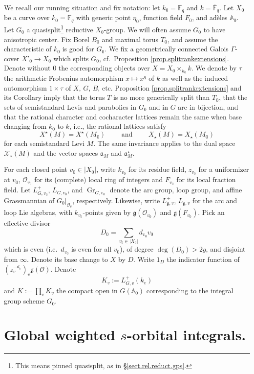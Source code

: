 \documentclass[openany]{amsbook}
\theoremstyle{definition}
\theoremstyle{remark}
\numberwithin{equation}{section}
\newcommand{\F}{\mathbb{F}}
\renewcommand{\O}{\mathcal{O}}
\newcommand{\cX}{\mathcal{X}}
\newcommand{\A}{\mathbb{A}}
\newcommand{\ol}[1]{\overline{#1}}
\renewcommand{\-}{\operatorname{-}}
\renewcommand{\a}{\mathfrak{a}}
\newcommand{\on}[1]{\operatorname{#1}}
\renewcommand{\A}{\mathbb{A}}
\renewcommand{\fg}{\mathfrak{g}}
\newcommand{\Gr}{\on{Gr}}
\begin{document}
We recall our running situation and fix notation: let $k_0 = \F_q$ and $k = \ol{\F}_q$. Let $X_0$ be a curve over $k_0 = \F_q$ with generic point $\eta_0$, function field $F_0$, and ad\`eles $\A_0$. Let $G_0$ a quasisplit\footnote{This means pinned quasisplit, as in \S \ref{sect.rel.reduct.gps}.} reductive $X_0$-group. We will often assume $G_0$ to have anisotropic center. Fix Borel $B_0$ and maximal torus $T_0$, and assume the characteristic of $k_0$ is good for $G_0$. We fix a geometrically connected Galois $\Gamma$-cover $X'_0 \to X_0$ which splits $G_0$, cf.\ Proposition \ref{prop.splitrankextensions}. Denote without $0$ the corresponding objects over $X = X_0 \times_{k_0} k$. We denote by $\tau$ the arithmetic Frobenius automorphism $x \mapsto x^q$ of $k$ as well as the induced automorphism $1 \times \tau$ of $X$, $G$, $B$, etc. Proposition \ref{prop.splitrankextensions} and its Corollary imply that the torus $T$ is no more generically split than $T_0$, that the sets of semistandard Levis and parabolics in $G_0$ and in $G$ are in bijection, and that the rational character and cocharacter lattices remain the same when base changing from $k_0$ to $k$, i.e., the rational lattices satisfy
$$
    X^\star(M) = X^\star(M_0) \qquad \text{ and }\qquad X_\star(M) = X_\star(M_0)
$$
for each semistandard Levi $M$. The same invariance applies to the dual space $\cX_\star(M)$ and the vector spaces $\a_M$ and $\a_M^\star$.

For each closed point $v_0 \in |X_0|$, write $k_{v_0}$ for its residue field, $z_{v_0}$ for a uniformizer at $v_0$, $\O_{v_0}$ for its (complete) local ring of integers and $F_{v_0}$ for its local fraction field. Let $L^+_{G,v_0}$, $L_{G,v_0}$, and $\Gr_{G,v_0}$ denote the arc group, loop group, and affine Grassmannian of $G_0|_{\O_v}$, respectively. Likewise, write $L^+_{\fg, v}$, $L_{\fg, v}$ for the arc and loop Lie algebras, with $k_{v_0}$-points given by $\fg(\O_{v_0})$ and $\fg(F_{v_0})$. Pick an effective divisor 
\[
    D_0 = \sum_{v_0 \in |X_0|} d_{v_0}  v_0
\]
which is even (i.e.\ $d_{v_0}$ is even for all $v_0$), of degree $\deg(D_0) > 2g$, and disjoint from $\infty$. Denote its base change to $X$ by $D$. Write $1_D$ the indicator function of $(z_v^{-d_v})_v \fg(\O)$. Denote 
\[
    K_v := L^+_{G,v}(k_v)
\]
and $K := \prod_v K_v$ the compact open in $G(\A_0)$ corresponding to the integral group scheme $G_0$.

\section{Global weighted $s$-orbital integrals.}\label{subsect.weighted.s.orbital.global}
\end{document}
